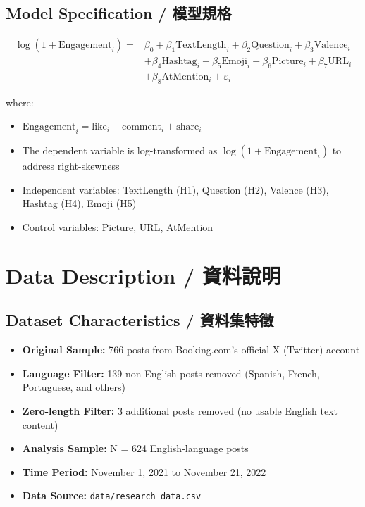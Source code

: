 \documentclass[12pt,a4paper]{article}
\begin{document}
\subsection{Model Specification / 模型規格}

\begin{equation}
\begin{aligned}
\log(1 + \text{Engagement}_i) = {}& \beta_0 + \beta_1\text{TextLength}_i + \beta_2\text{Question}_i + \beta_3\text{Valence}_i \\
& + \beta_4\text{Hashtag}_i + \beta_5\text{Emoji}_i + \beta_6\text{Picture}_i + \beta_7\text{URL}_i \\
& + \beta_8\text{AtMention}_i + \varepsilon_i
\end{aligned}
\end{equation}

where:
\begin{itemize}
    \item $\text{Engagement}_i = \text{like}_i + \text{comment}_i + \text{share}_i$
    \item The dependent variable is log-transformed as $\log(1 + \text{Engagement}_i)$ to address right-skewness
    \item Independent variables: TextLength (H1), Question (H2), Valence (H3), Hashtag (H4), Emoji (H5)
    \item Control variables: Picture, URL, AtMention
\end{itemize}

\section{Data Description / 資料說明}

\subsection{Dataset Characteristics / 資料集特徵}

\begin{itemize}
    \item \textbf{Original Sample:} 766 posts from Booking.com's official X (Twitter) account
    \item \textbf{Language Filter:} 139 non-English posts removed (Spanish, French, Portuguese, and others)
    \item \textbf{Zero-length Filter:} 3 additional posts removed (no usable English text content)
    \item \textbf{Analysis Sample:} N = 624 English-language posts
    \item \textbf{Time Period:} November 1, 2021 to November 21, 2022
    \item \textbf{Data Source:} \texttt{data/research\_data.csv}
\end{itemize}
\end{document}
